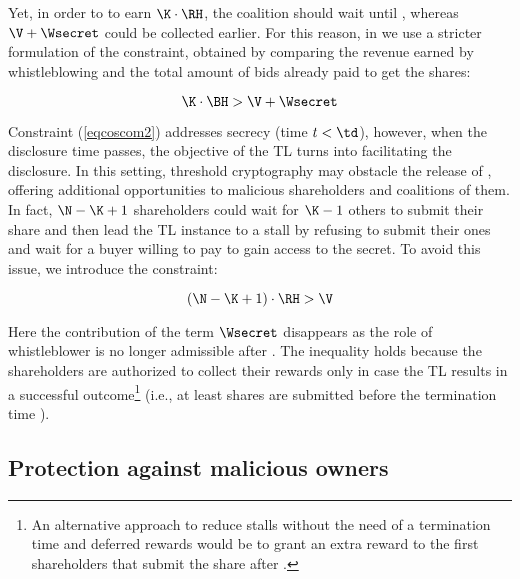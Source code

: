 Yet, in order to to earn $\K \cdot \RH$, the coalition \coalition should wait until \td, whereas $\V + \Wsecret$ could be collected earlier.
For this reason, in \shortname we use a stricter formulation of the constraint, obtained by comparing the revenue earned by whistleblowing and the total amount of bids already paid \coalition to get the shares:

\begin{equation}\label{eqcoscom2}
\K \cdot \BH > \V + \Wsecret
\end{equation}

Constraint (\ref{eqcoscom2}) addresses secrecy (time $t < \td$), however, when the disclosure time passes, the objective of the TL turns into facilitating the disclosure.
In this setting, threshold cryptography may obstacle the release of \secret, offering additional opportunities to malicious shareholders and coalitions of them.
In fact, $\N - \K + 1$ shareholders could wait for $\K - 1$ others to submit their share and then lead the TL instance to a stall by refusing to submit their ones and wait for a buyer willing to pay \V to gain access to the secret.
To avoid this issue, we introduce the constraint:  

\begin{equation}\label{eqcoscom4}
(\N - \K + 1) \cdot \RH  > \V
\end{equation}

Here the contribution of the term $\Wsecret$ disappears as the role of whistleblower is no longer admissible after \td. The inequality holds because the shareholders are authorized to collect their rewards \RH only in case the TL results in a successful outcome\footnote{An alternative approach to reduce stalls without the need of a termination time and deferred rewards would be to grant an extra reward \extrareward to the first \K shareholders that submit the share after \td.
}
(i.e., at least \K shares are submitted before the termination time \te).


\subsection{Protection against malicious owners}\label{sect:mal_own}

